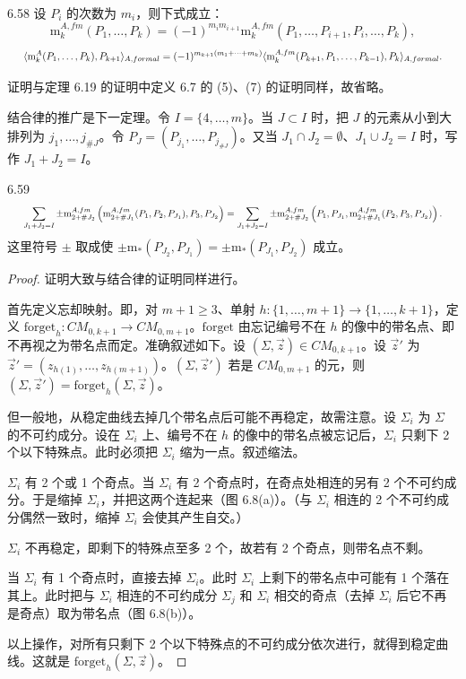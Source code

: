 \begin{lemma}{6.58}
  设 $P_i$ 的次数为 $m_i$，则下式成立：
  \[
    \mathrm{m}_k^{A,fm}(P_1,\dots,P_k)=(-1)^{m_im_{i+1}}\mathrm{m}_k^{A,fm}(P_1,\dots,P_{i+1},P_i,\dots,P_k),
  \]
\[
  \resizebox{0.97\linewidth}{!}{$\displaystyle \langle\mathrm{m}_k^A(P_1,\dots,P_k),P_{k+1}\rangle_{A,formal}=(-1)^{m_{k+1}(m_1+\dots+m_k)}\langle\mathrm{m}_k^{A,fm}(P_{k+1},P_1,\dots,P_{k-1}),P_k\rangle_{A,formal}. $}
\]
\end{lemma}

证明与定理 6.19 的证明中定义 6.7 的 (5)、(7) 的证明同样，故省略。

结合律的推广是下一定理。令 $I=\{4,\dots,m\}$。当 $J\subset I$ 时，把 $J$ 的元素从小到大排列为 $j_1,\dots,j_{\#J}$。令 $P_J=(P_{j_1},\dots,P_{j_{\#J}})$。又当 $J_1\cap J_2=\emptyset$、$J_1\cup J_2=I$ 时，写作 $J_1+J_2=I$。

\begin{theorem*}{6.59}
\[
  \resizebox{0.97\linewidth}{!}{$\displaystyle \sum_{J_1+J_2=I}\pm\mathrm{m}_{2+\#J_2}^{A,fm}\left(\mathrm{m}_{2+\#J_1}^{A,fm}(P_1,P_2,P_{J_1}),P_3,P_{J_2}\right) =\sum_{J_1+J_2=I}\pm\mathrm{m}_{2+\#J_2}^{A,fm}\left(P_1,P_{J_1},\mathrm{m}_{2+\#J_1}^{A,fm}(P_2,P_3,P_{J_2})\right). $}
\]
  这里符号 $\pm$ 取成使 $\pm\mathrm{m}_*(P_{J_2},P_{J_1})=\pm\mathrm{m}_*(P_{J_1},P_{J_2})$ 成立。
\end{theorem*}
\begin{proof}
  证明大致与结合律的证明同样进行。

  首先定义忘却映射。即，对 $m+1\ge3$、单射 $h:\{1,\dots,m+1\}\to\{1,\dots,k+1\}$，定义 $\mathrm{forget}_h:CM_{0,k+1}\to CM_{0,m+1}$。$\mathrm{forget}$ 由忘记编号不在 $h$ 的像中的带名点、即不再视之为带名点而定。准确叙述如下。设 $(\Sigma,\vec z)\in CM_{0,k+1}$。设 $\vec z'$ 为 $\vec z'=(z_{h(1)},\dots,z_{h(m+1)})$。$(\Sigma,\vec z')$
  若是 $CM_{0,m+1}$ 的元，则 $(\Sigma,\vec z')=\mathrm{forget}_h(\Sigma,\vec z)$。

  但一般地，从稳定曲线去掉几个带名点后可能不再稳定，故需注意。设 $\Sigma_i$ 为 $\Sigma$ 的不可约成分。设在 $\Sigma_i$ 上、编号不在 $h$ 的像中的带名点被忘记后，$\Sigma_i$ 只剩下 2 个以下特殊点。此时必须把 $\Sigma_i$ 缩为一点。叙述缩法。

  $\Sigma_i$ 有 2 个或 1 个奇点。当 $\Sigma_i$ 有 2 个奇点时，在奇点处相连的另有 2 个不可约成分。于是缩掉 $\Sigma_i$，并把这两个连起来（图 6.8(a)）。（与 $\Sigma_i$ 相连的 2 个不可约成分偶然一致时，缩掉 $\Sigma_i$ 会使其产生自交。）

  $\Sigma_i$ 不再稳定，即剩下的特殊点至多 2 个，故若有 2 个奇点，则带名点不剩。

  当 $\Sigma_i$ 有 1 个奇点时，直接去掉 $\Sigma_i$。此时 $\Sigma_i$ 上剩下的带名点中可能有 1 个落在其上。此时把与 $\Sigma_i$ 相连的不可约成分 $\Sigma_j$ 和 $\Sigma_i$ 相交的奇点（去掉 $\Sigma_i$ 后它不再是奇点）取为带名点（图 6.8(b)）。

  以上操作，对所有只剩下 2 个以下特殊点的不可约成分依次进行，就得到稳定曲线。这就是 $\mathrm{forget}_h(\Sigma,\vec z)$。
\end{proof}

